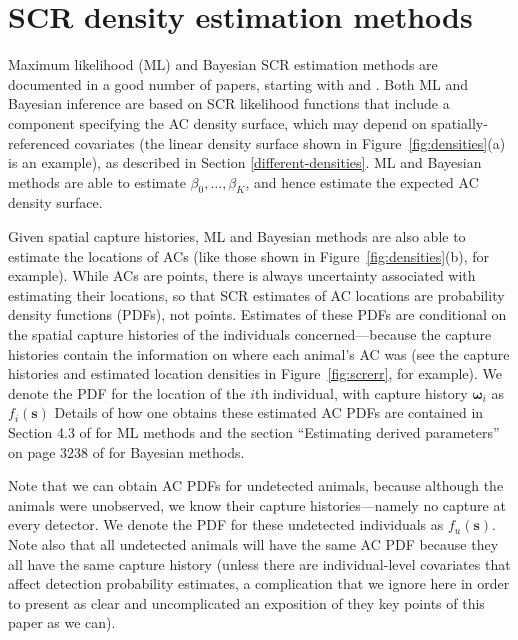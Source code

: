 \documentclass[useAMS,usenatbib,referee]{biom}
\begin{document}

\section{SCR density estimation methods} \label{secrmethods}

Maximum likelihood (ML) and Bayesian SCR estimation methods are documented in a good number of papers, starting with \cite{Borchers+Efford:08} and \cite{Royle+Young:08}. Both ML and Bayesian inference are based on SCR likelihood functions that include a component specifying the AC density surface, which may depend on spatially-referenced covariates (the linear density surface shown in Figure~\ref{fig:densities}(a) is an example), as described in Section \ref{different-densities}. ML and Bayesian methods are able to estimate $\beta_0,\ldots,\beta_K$, and hence estimate the expected AC density surface. 

Given spatial capture histories, ML and Bayesian methods are also able to estimate the locations of ACs (like those shown in Figure~\ref{fig:densities}(b), for example). While ACs are points, there is always uncertainty associated with estimating their locations, so that SCR estimates of AC locations are probability density functions (PDFs), not points. Estimates of these PDFs are conditional on the spatial capture histories of the individuals concerned---because the capture histories contain the information on where each animal's AC was (see the capture histories and estimated location densities in Figure~\ref{fig:screrr}, for example). We denote the PDF for the location of the $i$th individual, with capture history $\bm{\omega}_i$ as $f_i(\bm{s})$ Details of how one obtains these estimated AC PDFs are contained in Section 4.3 of \cite{Borchers+Efford:08} for ML methods and the section ``Estimating derived parameters'' on page 3238 of \cite{Royle+al:09b} for Bayesian methods.

Note that we can obtain AC PDFs for undetected animals, because although the animals were unobserved, we know their capture histories---namely no capture at every detector. We denote the PDF for these undetected individuals as $f_u(\bm{s})$. Note also that all undetected animals will have the same AC PDF because they all have the same capture history (unless there are individual-level covariates that affect detection probability estimates, a complication that we ignore here in order to present as clear and uncomplicated an exposition of they key points of this paper as we can). 
\end{document}
